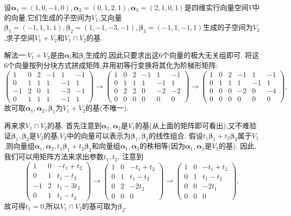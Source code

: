 \documentclass[../../main.tex]{subfiles}%
\begin{document}
\begin{example}
设\(\boldsymbol{\alpha}_1=(1,0, - 1,0),\boldsymbol{\alpha}_2=(0,1,2,1),\boldsymbol{\alpha}_3=(2,1,0,1)\)是四维实行向量空间\(V\)中的向量,它们生成的子空间为\(V_1\),又向量\(\boldsymbol{\beta}_1=(-1,1,1,1),\boldsymbol{\beta}_2=(1,-1,-3,-1),\boldsymbol{\beta}_3=(-1,1,-1,1)\)生成的子空间为\(V_2\),求子空间\(V_1 + V_2\)和\(V_1\cap V_2\)的基.
\end{example}
\begin{solution}

{\color{blue}解法一:}\(V_1 + V_2\)是由\(\boldsymbol{\alpha}_i\)和\(\boldsymbol{\beta}_i\)生成的,因此只要求出这6个向量的极大无关组即可. 将这6个向量按列分块方式拼成矩阵,并用初等行变换将其化为阶梯形矩阵:
\[
\begin{pmatrix}
1&0&2&-1&1&-1\\
0&1&1&1&-1&1\\
-1&2&0&1&-3&-1\\
0&1&1&1&-1&1
\end{pmatrix}\to
\begin{pmatrix}
1&0&2&-1&1&-1\\
0&1&1&1&-1&1\\
0&2&2&0&-2&-2\\
0&0&0&0&0&0
\end{pmatrix}\to
\begin{pmatrix}
1&0&2&-1&1&-1\\
0&1&1&1&-1&1\\
0&0&0&-2&0&-4\\
0&0&0&0&0&0
\end{pmatrix},
\]
故可取\(\boldsymbol{\alpha}_1,\boldsymbol{\alpha}_2,\boldsymbol{\beta}_1\)为\(V_1 + V_2\)的基(不唯一).

再来求\(V_1\cap V_2\)的基. 首先注意到\(\boldsymbol{\alpha}_1,\boldsymbol{\alpha}_2\)是\(V_1\)的基(从上面的矩阵即可看出),又不难验证\(\boldsymbol{\beta}_1,\boldsymbol{\beta}_2\)是\(V_2\)的基,\(V_2\)中的向量可以表示为\(\boldsymbol{\beta}_1,\boldsymbol{\beta}_2\)的线性组合. 假设\(t_1\boldsymbol{\beta}_1 + t_2\boldsymbol{\beta}_2\)属于\(V_1\),则向量组\(\boldsymbol{\alpha}_1,\boldsymbol{\alpha}_2,t_1\boldsymbol{\beta}_1 + t_2\boldsymbol{\beta}_2\)和向量组\(\boldsymbol{\alpha}_1,\boldsymbol{\alpha}_2\)的秩相等(因为\(\boldsymbol{\alpha}_1,\boldsymbol{\alpha}_2\)是\(V_1\)的基). 因此,我们可以用矩阵方法来求出参数\(t_1,t_2\). 注意到
\[
\begin{pmatrix}
1&0&-t_1 + t_2\\
0&1&t_1 - t_2\\
-1&2&t_1 - 3t_2\\
0&1&t_1 - t_2
\end{pmatrix}\to
\begin{pmatrix}
1&0&-t_1 + t_2\\
0&1&t_1 - t_2\\
0&2&-2t_2\\
0&0&0
\end{pmatrix}\to
\begin{pmatrix}
1&0&-t_1 + t_2\\
0&1&t_1 - t_2\\
0&0&-2t_1\\
0&0&0
\end{pmatrix},
\]
故可得\(t_1 = 0\),所以\(V_1\cap V_2\)的基可取为\(\boldsymbol{\beta}_2\).


\end{solution}
\end{document}
